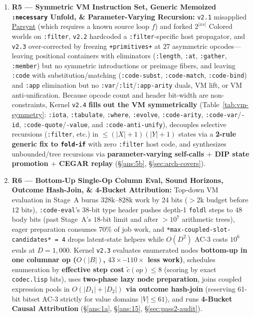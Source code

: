 \documentclass[12pt]{article}
\newcommand{\litref}[2]{\hyperlink{lit:#1}{\textcolor{citegreen}{#2}}}
\begin{document}
\begin{enumerate}[leftmargin=1.6em, itemsep=0.28em]
  \item \textbf{R5 --- Symmetric VM Instruction Set, Generic Memoized \texttt{:necessary} Unfold, \& Parameter-Varying Recursion:} \texttt{v2.1} misapplied \litref{farzan2017}{Parsynt} (which requires a known source loop $f$) and forked $2^{|xs|}$ Colored worlds on \texttt{:filter}, \texttt{v2.2} hardcoded a \texttt{:filter}-specific host propagator, and \texttt{v2.3} over-corrected by freezing \texttt{+primitives+} at $27$ asymmetric opcodes---leaving positional containers with eliminators (\texttt{:length}, \texttt{:at}, \texttt{:gather}, \texttt{:member}) but no symmetric introductions or preimage fibers, and leaving \texttt{:code} with substitution/matching (\texttt{:code-subst}, \texttt{:code-match}, \texttt{:code-bind}) and \texttt{:app} elimination but no \texttt{:var}/\texttt{:lit}/\texttt{:app-arity} duals, VM lift, or VM anti-unification. Because opcode count and header bit-width are non-constraints, Kernel \texttt{v2.4} \textbf{fills out the VM symmetrically} (Table~\ref{tab:vm-symmetry}: \texttt{:iota}, \texttt{:tabulate}, \texttt{:where}, \texttt{:evolve}, \texttt{:code-arity}, \texttt{:code-var}/\texttt{-id}, \texttt{:code-quote}/\texttt{-value}, and \texttt{:code-anti-unify}), decouples selective recursions (\texttt{:filter}, etc.) in $\le (|X|+1)(|Y|+1)$ states via a \textbf{2-rule generic fix to \texttt{fold-if}} with zero \texttt{:filter} host code, and synthesizes unbounded/tree recursions via \textbf{parameter-varying self-calls $+$ DIP state promotion $+$ CEGAR replay} (\S\ref{ans:5b}, \S\ref{sec:arch-covers}).

  \item \textbf{R6 --- Bottom-Up Single-Op Column Eval, Sound Horizons, Outcome Hash-Join, \& 4-Bucket Attribution:} Top-down VM evaluation in Stage~A burns $328\mathrm{k}$--$828\mathrm{k}$ work by $24$ bits ($>2\mathrm{k}$ budget before $12$ bits), \texttt{:code-eval}'s $38$-bit type header pushes depth-1 \texttt{foldl} steps to $48$ body bits (past Stage~A's $18$-bit limit and after $>10^7$ arithmetic trees), eager preparation consumes $70\%$ of job work, and \texttt{*max-coupled-slot-candidates* = 4} drops latent-state helpers while $O(D^2)$ AC-3 costs $10^6$ evals at $D=1,000$. Kernel \texttt{v2.3} evaluates enumerated nodes \textbf{bottom-up in one columnar op ($O(|B|)$, $43\times$--$110\times$ less work)}, schedules enumeration by \textbf{effective step cost $\tilde{c}(op)\le 8$} (scoring by exact \texttt{codec.lisp} bits), uses \textbf{two-phase lazy node preparation}, joins coupled expression pools in \textbf{$O(|D_1|+|D_2|)$ via outcome hash-join} (reserving 61-bit bitset AC-3 strictly for value domains $|V|\le 61$), and runs \textbf{4-Bucket Causal Attribution} (\S\ref{ans:1a}, \S\ref{ans:15}, \S\ref{sec:pass2-audit}).
\end{enumerate}
\end{document}
